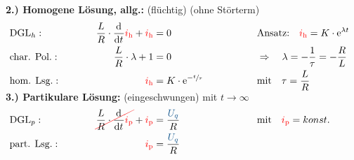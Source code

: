 {\begin{frame}
\textbf{2.) Homogene Lösung, allg.:} (flüchtig) (ohne Störterm)%
\begin{align*}%
    &\text{DGL}_{h}:&&&
        \frac{L}{R} \cdot \dt \eci{i_{\mathrm h}} + \eci{i_{\mathrm h}} &= 0 &&&
            &\text{Ansatz:}\quad
            \eci{i_{\mathrm h}} = K \cdot \mathrm{e}^{\lambda t}\\
    &\text{char. Pol.}:&&&
        \frac{L}{R} \cdot \lambda + 1 &= 0 &&&
            &\Rightarrow\quad \lambda = -\frac{1}{\tau} = -\frac{R}{L}\\
    &\text{hom. Lsg.}:&&&
        \eci{i_{\mathrm h}} &= K \cdot \mathrm{e}^{-\sfrac{t}{\tau}}&&&
            &\text{mit}\quad \tau = \frac{L}{R}
    \\[-15pt]&\hphantom{R1oooooooooo}&&&\hphantom{L3ooooooooooo}&\hphantom{R3ooooooooooooooo}&&&&\hphantom{R5oooooooooooooooooo}\nonumber%
\end{align*}%
\pause%
\textbf{3.) Partikulare Lösung:} (eingeschwungen) mit $t \to \infty$%
\begin{align*}%
    &\text{DGL}_{p}:&&&
        \redcancel{\frac{L}{R} \cdot \dt \eci{i_{\mathrm p}}} + \eci{i_{\mathrm p}} &= \frac{\ecv{U_q}}{R} &&&
            &\text{mit}\quad \eci{i_{\mathrm p}} = konst.  \\
    &\text{part. Lsg.}:&&&
        \eci{i_{\mathrm p}} &= \frac{\ecv{U_q}}{R}
    \\[-15pt]&\hphantom{R1oooooooooo}&&&\hphantom{L3ooooooooooo}&\hphantom{R3ooooooooooooooo}&&&&\hphantom{R5oooooooooooooooooo}\nonumber%
\end{align*}%
\end{frame}

}
